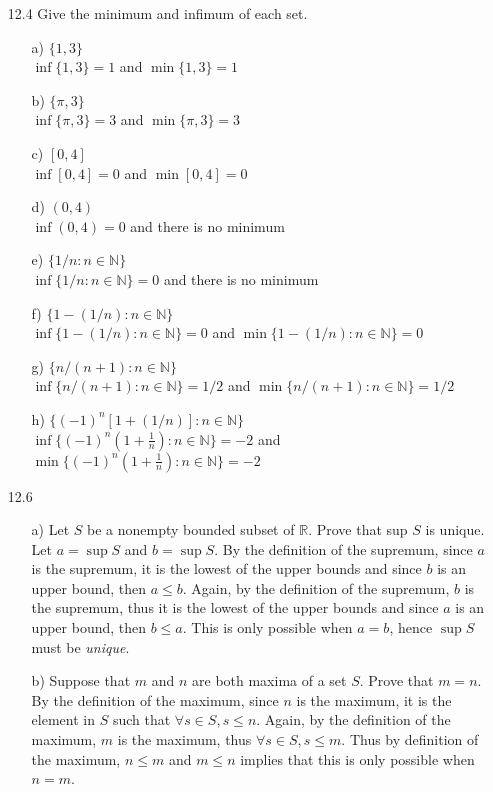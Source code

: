 \documentclass[12pt]{article}
\begin{document}
\begin{enumerate}
\item[12.4] Give the minimum and infimum of each set.
\begin{enumerate}
\item[a)] $\{ 1, 3 \}$ \\
$\inf \{1, 3\} = 1$ and $\min \{1, 3\} = 1$
\item[b)] $\{ \pi , 3 \}$ \\
$\inf \{\pi, 3\} = 3$ and $\min \{\pi, 3\} = 3$
\item[c)] $[0, 4]$ \\
$\inf [0, 4] = 0$ and $\min [0, 4] = 0$
\item[d)] $(0, 4)$ \\
$\inf (0, 4) = 0$ and there is no minimum
\item[e)] $\{ 1/n : n \in \mathbb{N} \}$ \\
$\inf \{1/n : n\in \mathbb{N}\} = 0$ and there is no minimum
\item[f)] $\{ 1 - (1/n) : n \in \mathbb{N} \}$ \\
$\inf \{1 - (1/n) : n\in \mathbb{N}\} = 0$ and $\min \{1 - (1/n) : n\in \mathbb{N}\} = 0$
\item[g)] $\{ n/(n + 1) : n \in \mathbb{N} \}$ \\
$\inf \{n/(n + 1) : n\in \mathbb{N}\} = 1/2$ and $\min \{n/(n + 1) : n\in \mathbb{N}\} = 1/2$
\item[h)] $\{ (-1)^n[1 + (1/n)] : n \in \mathbb{N} \}$ \\
$\inf \{(-1)^n \left(1 + \frac{1}{n}\right) : n \in \mathbb{N}\} = -2$ and 
$\min \{(-1)^n \left(1 + \frac{1}{n}\right) : n \in \mathbb{N}\} = -2$
\end{enumerate}

\item[12.6] 
\begin{enumerate}
\item[a)] Let $S$ be a nonempty bounded subset of $\mathbb{R}$. Prove that sup $S$ is unique. \\
Let $a = \sup S$ and $b = \sup S$. By the definition of the supremum, since $a$ is the supremum, it is the lowest of the upper bounds and since $b$ is an upper bound, then $a \leq b$. Again, by the definition of the supremum, $b$ is the supremum, thus it is the lowest of the upper bounds and since $a$ is an upper bound, then $b \leq a$. This is only possible when $a = b$, hence $\sup S$ must be \emph{unique}.
\item[b)] Suppose that $m$ and $n$ are both maxima of a set $S$. Prove that $m = n$. \\
By the definition of the maximum, since $n$ is the maximum, it is the element in $S$ such that
$\forall s \in S, s \leq n$. Again, by the definition of the maximum, $m$ is the maximum, 
thus $\forall s \in S, s \leq m$. Thus by definition of the maximum, $n \leq m$ and $m \leq n$ implies that this is only possible when $n = m$.
\end{enumerate}


\end{enumerate}
\end{document}

